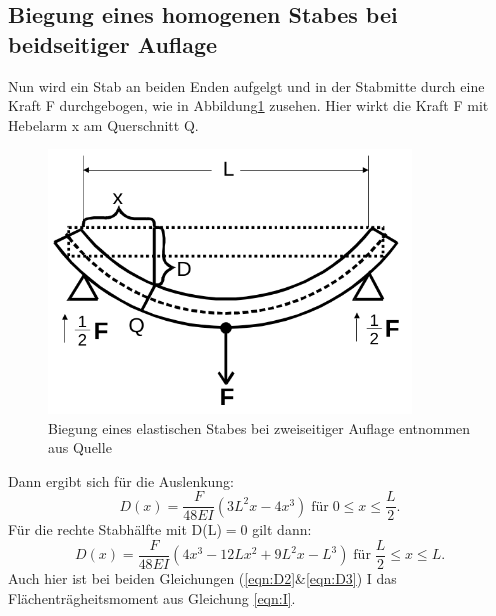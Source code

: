 \subsection{Biegung eines homogenen Stabes bei beidseitiger Auflage}
\label{sec:T2}
Nun wird ein Stab an beiden Enden aufgelgt und in der Stabmitte
durch eine Kraft F durchgebogen, wie in Abbildung\ref{fig:abb5} zusehen. Hier
wirkt die Kraft F mit Hebelarm x am Querschnitt Q.
\begin{figure}
  \centering
  \includegraphics[height= 7cm]{logos/Abb5.png}
  \caption{Biegung eines elastischen Stabes bei zweiseitiger Auflage
  entnommen aus Quelle \cite{Anleitung} }
  \label{fig:abb5}
\end{figure}
\FloatBarrier
Dann ergibt sich für die Auslenkung:
\begin{equation}
  D(x) = \frac{F}{48 EI}
  \left( 3L^2 x-4x^3 \right) \; \text{für} \;
  0 \leq x \leq \frac{L}{2} .
  \label{eqn:D2}
\end{equation}
Für die rechte Stabhälfte mit D(L)$=$0 gilt dann:
\begin{equation}
  D(x) = \frac{F}{48 EI}
  \left(4 x^3 - 12 Lx^2 + 9 L^2x - L^3\right)
  \; \text{für} \; \frac{L}{2} \leq x \leq L .
  \label{eqn:D3}
\end{equation}
Auch hier ist bei beiden Gleichungen (\eqref{eqn:D2}\&\eqref{eqn:D3}) I das
Flächenträgheitsmoment aus Gleichung \eqref{eqn:I}.
